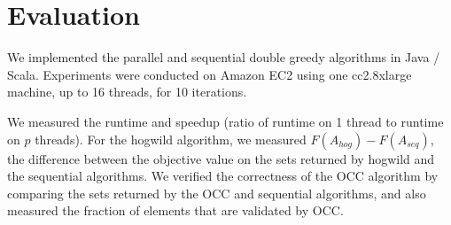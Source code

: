 \documentclass{article} %
\begin{document}
\section{Evaluation}

We implemented the parallel and sequential double greedy algorithms in Java / Scala.
Experiments were conducted on Amazon EC2 using one cc2.8xlarge machine, up to 16 threads, for 10 iterations.

We measured the runtime and speedup (ratio of runtime on 1 thread to runtime on $p$ threads).
For the hogwild algorithm, we measured $F(A_{hog})-F(A_{seq})$, the difference between the objective value on the sets returned by hogwild and the sequential algorithms.
We verified the correctness of the OCC algorithm by comparing the sets returned by the OCC and sequential algorithms, and also measured the fraction of elements that are validated by OCC.

\end{document}

